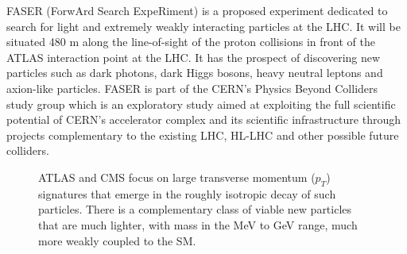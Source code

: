 FASER (ForwArd Search ExpeRiment) is a proposed experiment dedicated to search for light and extremely weakly interacting particles at the LHC. It will be situated 480 m along the line-of-sight of the proton collisions in front of the ATLAS interaction point at the LHC. It has the prospect of discovering new particles such as dark photons, dark Higgs bosons, heavy neutral leptons and axion-like particles. FASER is part of the CERN's Physics Beyond Colliders study group which is an exploratory study aimed at exploiting the full scientific potential of CERN's accelerator complex and its scientific infrastructure through projects complementary to the existing LHC, HL-LHC and other possible future colliders.

\begin{figure}
\centering    
\caption[Diagram coupling strenght vs Mass]{ATLAS and CMS focus on large transverse momentum ($p_{T}$) signatures that emerge in the roughly isotropic decay of such particles. There is a complementary class of viable new particles that are much lighter, with mass in the MeV to GeV range, much more weakly coupled to the SM.}
\label{fig:CouplingStrength_Mass}
\end{figure}

